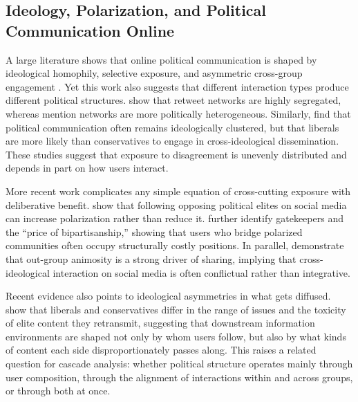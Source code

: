 \documentclass[letterpaper]{article} %
\begin{document}


\subsection{Ideology, Polarization, and Political Communication Online}


A large literature shows that online political communication is shaped by ideological homophily, selective exposure, and asymmetric cross-group engagement \cite{adamic_political_2005, conover_political_2011, flaxman_filter_2016, del_vicario_echo_2016}. Yet this work also suggests that different interaction types produce different political structures. \citet{conover_political_2011} show that retweet networks are highly segregated, whereas mention networks are more politically heterogeneous. Similarly, \citet{barbera_tweeting_2015} find that political communication often remains ideologically clustered, but that liberals are more likely than conservatives to engage in cross-ideological dissemination. These studies suggest that exposure to disagreement is unevenly distributed and depends in part on how users interact.

More recent work complicates any simple equation of cross-cutting exposure with deliberative benefit. \citet{bail_exposure_2018} show that following opposing political elites on social media can increase polarization rather than reduce it. \citet{garimella_political_2018} further identify gatekeepers and the ``price of bipartisanship,'' showing that users who bridge polarized communities often occupy structurally costly positions. In parallel, \citet{rathje_outgroup_2021} demonstrate that out-group animosity is a strong driver of sharing, implying that cross-ideological interaction on social media is often conflictual rather than integrative.

Recent evidence also points to ideological asymmetries in what gets diffused. \citet{chang_share_2025} show that liberals and conservatives differ in the range of issues and the toxicity of elite content they retransmit, suggesting that downstream information environments are shaped not only by whom users follow, but also by what kinds of content each side disproportionately passes along. This raises a related question for cascade analysis: whether political structure operates mainly through user composition, through the alignment of interactions within and across groups, or through both at once.
\end{document}
